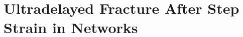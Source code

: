 \documentclass[asymmetricmargins]{library/duthesis}%
\begin{document}


% 
 \newpage 
 \newpage %

\chapter{Ultradelayed Fracture After Step Strain in Networks} \label{sec:Ultradelayed}
\end{document}
